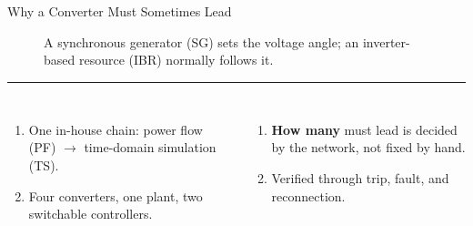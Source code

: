 \documentclass{beamer}
\begin{document}
\begin{frame}{Why a Converter Must Sometimes Lead}
\begin{figure}
\caption{A synchronous generator (SG) sets the voltage angle; an inverter-based
resource (IBR) normally follows it.}
\label{fig:why}
\end{figure}

\vspace{-0.10cm}
\hrule
\vspace{0.16cm}
\footnotesize
\begin{columns}[t,onlytextwidth]
\begin{enumerate}\setlength{\itemsep}{3pt}
  \item One in-house chain: power flow (PF) $\rightarrow$ time-domain simulation
        (TS).
  \item Four converters, one plant, two switchable controllers.
\end{enumerate}
\begin{enumerate}\setlength{\itemsep}{3pt}\setcounter{enumi}{2}
  \item \textbf{How many} must lead is decided by the network, not fixed by hand.
  \item Verified through trip, fault, and reconnection.
\end{enumerate}
\end{columns}
\end{frame}

%
%
\end{document}
